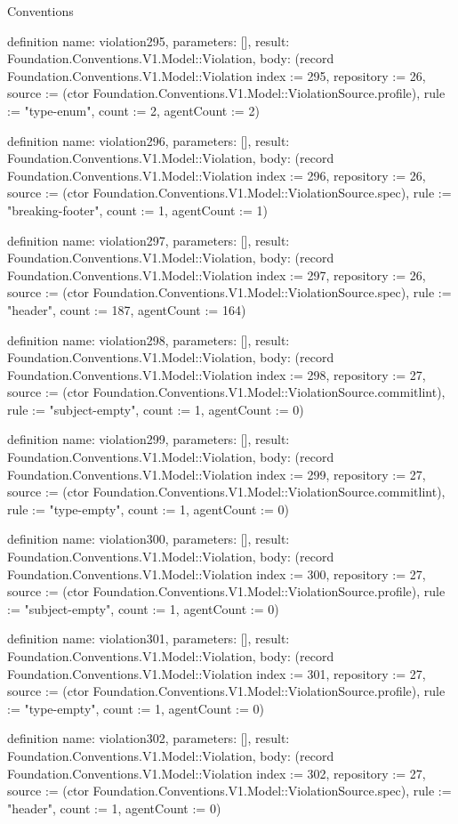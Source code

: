 \begin{lexlean}{Conventions}
\begin{semanticmodule}
definition{
  name: violation295,
  parameters: [],
  result: Foundation.Conventions.V1.Model::Violation,
  body: (record Foundation.Conventions.V1.Model::Violation {index := 295, repository := 26, source := (ctor Foundation.Conventions.V1.Model::ViolationSource.profile), rule := "type-enum", count := 2, agentCount := 2})
}

definition{
  name: violation296,
  parameters: [],
  result: Foundation.Conventions.V1.Model::Violation,
  body: (record Foundation.Conventions.V1.Model::Violation {index := 296, repository := 26, source := (ctor Foundation.Conventions.V1.Model::ViolationSource.spec), rule := "breaking-footer", count := 1, agentCount := 1})
}

definition{
  name: violation297,
  parameters: [],
  result: Foundation.Conventions.V1.Model::Violation,
  body: (record Foundation.Conventions.V1.Model::Violation {index := 297, repository := 26, source := (ctor Foundation.Conventions.V1.Model::ViolationSource.spec), rule := "header", count := 187, agentCount := 164})
}

definition{
  name: violation298,
  parameters: [],
  result: Foundation.Conventions.V1.Model::Violation,
  body: (record Foundation.Conventions.V1.Model::Violation {index := 298, repository := 27, source := (ctor Foundation.Conventions.V1.Model::ViolationSource.commitlint), rule := "subject-empty", count := 1, agentCount := 0})
}

definition{
  name: violation299,
  parameters: [],
  result: Foundation.Conventions.V1.Model::Violation,
  body: (record Foundation.Conventions.V1.Model::Violation {index := 299, repository := 27, source := (ctor Foundation.Conventions.V1.Model::ViolationSource.commitlint), rule := "type-empty", count := 1, agentCount := 0})
}

definition{
  name: violation300,
  parameters: [],
  result: Foundation.Conventions.V1.Model::Violation,
  body: (record Foundation.Conventions.V1.Model::Violation {index := 300, repository := 27, source := (ctor Foundation.Conventions.V1.Model::ViolationSource.profile), rule := "subject-empty", count := 1, agentCount := 0})
}

definition{
  name: violation301,
  parameters: [],
  result: Foundation.Conventions.V1.Model::Violation,
  body: (record Foundation.Conventions.V1.Model::Violation {index := 301, repository := 27, source := (ctor Foundation.Conventions.V1.Model::ViolationSource.profile), rule := "type-empty", count := 1, agentCount := 0})
}

definition{
  name: violation302,
  parameters: [],
  result: Foundation.Conventions.V1.Model::Violation,
  body: (record Foundation.Conventions.V1.Model::Violation {index := 302, repository := 27, source := (ctor Foundation.Conventions.V1.Model::ViolationSource.spec), rule := "header", count := 1, agentCount := 0})
}


\end{semanticmodule}
\end{lexlean}
